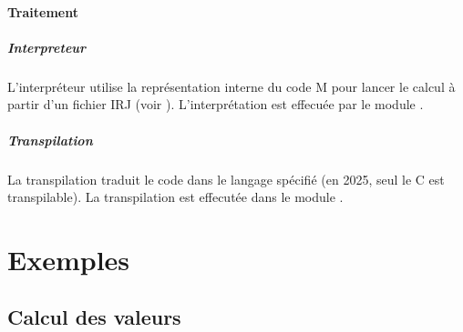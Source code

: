 \documentclass[letterpaper,10pt,french]{sphinxmanual}
\begin{document}
\subsubsection{Traitement}
\label{\detokenize{mlang:traitement}}

\paragraph{Interpreteur}
\label{\detokenize{mlang:interpreteur}}
\sphinxAtStartPar
L’interpréteur utilise la représentation interne du code M
pour lancer le calcul à partir d’un fichier IRJ
(voir {\hyperref[\detokenize{syntax_irj:syntax-irj}]{}}).
L’interprétation est effecuée par le module .


\paragraph{Transpilation}
\label{\detokenize{mlang:transpilation}}
\sphinxAtStartPar
La transpilation traduit le code dans le langage spécifié (en 2025, seul le C
est transpilable). La transpilation est effecutée dans le module
.


\chapter{Exemples}
\label{\detokenize{index:exemples}}
\sphinxstepscope


\section{Calcul des valeurs}
\label{\detokenize{exemples/valeurs:calcul-des-valeurs}}\label{\detokenize{exemples/valeurs:exemples-valeurs}}\label{\detokenize{exemples/valeurs::doc}}
\end{document}
